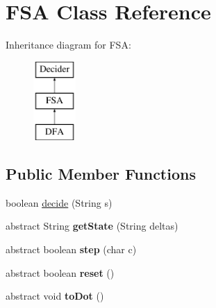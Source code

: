 \hypertarget{class_f_s_a}{}\section{F\+SA Class Reference}
\label{class_f_s_a}
Inheritance diagram for F\+SA\+:\begin{figure}[H]
\begin{center}
\leavevmode
\includegraphics[height=3.000000cm]{class_f_s_a}
\end{center}
\end{figure}
\subsection*{Public Member Functions}
\begin{DoxyCompactItemize}
\item 
boolean \mbox{\hyperlink{class_f_s_a_ae397e97abea4e09b0f8487d7caf70104}{decide}} (String s)
\item 
\mbox{\label{class_f_s_a_ac77519ed0a14cfa586daa7756fc24168}} 
abstract String {\bfseries get\+State} (String deltas)
\item 
\mbox{\label{class_f_s_a_a5ab70d6bc8ab3c9b9b161e4fe856bba0}} 
abstract boolean {\bfseries step} (char c)
\item 
\mbox{\label{class_f_s_a_a66aa769a90ca1e2b7eac3c3653d0c396}} 
abstract boolean {\bfseries reset} ()
\item 
\mbox{\label{class_f_s_a_af073959a7cc6e9f938008d02e9e5cbbe}} 
abstract void {\bfseries to\+Dot} ()
\end{DoxyCompactItemize}
